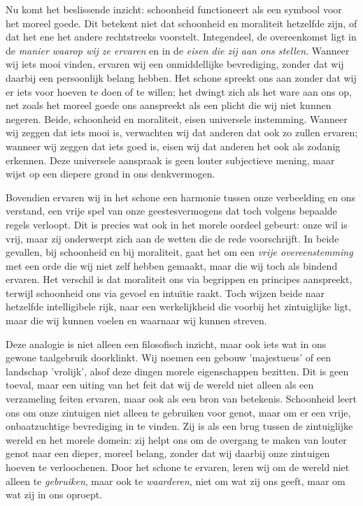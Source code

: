 \begin{mdframed}[leftmargin=0pt,rightmargin=0pt,backgroundcolor=blue!6,linecolor=white,innertopmargin=6pt,innerbottommargin=6pt]
Nu komt het beslissende inzicht: schoonheid functioneert als een symbool voor het moreel goede. Dit betekent niet dat schoonheid en moraliteit hetzelfde zijn, of dat het ene het andere rechtstreeks voorstelt. Integendeel, de overeenkomst ligt in de \textit{manier waarop wij ze ervaren} en in de \textit{eisen die zij aan ons stellen}. Wanneer wij iets mooi vinden, ervaren wij een onmiddellijke bevrediging, zonder dat wij daarbij een persoonlijk belang hebben. Het schone spreekt ons aan zonder dat wij er iets voor hoeven te doen of te willen; het dwingt zich als het ware aan ons op, net zoals het moreel goede ons aanspreekt als een plicht die wij niet kunnen negeren. Beide, schoonheid en moraliteit, eisen universele instemming. Wanneer wij zeggen dat iets mooi is, verwachten wij dat anderen dat ook zo zullen ervaren; wanneer wij zeggen dat iets goed is, eisen wij dat anderen het ook als zodanig erkennen. Deze universele aanspraak is geen louter subjectieve mening, maar wijst op een diepere grond in ons denkvermogen.

Bovendien ervaren wij in het schone een harmonie tussen onze verbeelding en ons verstand, een vrije spel van onze geestesvermogens dat toch volgens bepaalde regels verloopt. Dit is precies wat ook in het morele oordeel gebeurt: onze wil is vrij, maar zij onderwerpt zich aan de wetten die de rede voorschrijft. In beide gevallen, bij schoonheid en bij moraliteit, gaat het om een \textit{vrije overeenstemming} met een orde die wij niet zelf hebben gemaakt, maar die wij toch als bindend ervaren. Het verschil is dat moraliteit ons via begrippen en principes aanspreekt, terwijl schoonheid ons via gevoel en intuïtie raakt. Toch wijzen beide naar hetzelfde intelligibele rijk, naar een werkelijkheid die voorbij het zintuiglijke ligt, maar die wij kunnen voelen en waarnaar wij kunnen streven.

Deze analogie is niet alleen een filosofisch inzicht, maar ook iets wat in ons gewone taalgebruik doorklinkt. Wij noemen een gebouw 'majestueus' of een landschap 'vrolijk', alsof deze dingen morele eigenschappen bezitten. Dit is geen toeval, maar een uiting van het feit dat wij de wereld niet alleen als een verzameling feiten ervaren, maar ook als een bron van betekenis. Schoonheid leert ons om onze zintuigen niet alleen te gebruiken voor genot, maar om er een vrije, onbaatzuchtige bevrediging in te vinden. Zij is als een brug tussen de zintuiglijke wereld en het morele domein: zij helpt ons om de overgang te maken van louter genot naar een dieper, moreel belang, zonder dat wij daarbij onze zintuigen hoeven te verloochenen. Door het schone te ervaren, leren wij om de wereld niet alleen te \textit{gebruiken}, maar ook te \textit{waarderen}, niet om wat zij ons geeft, maar om wat zij in ons oproept.


\end{mdframed}
